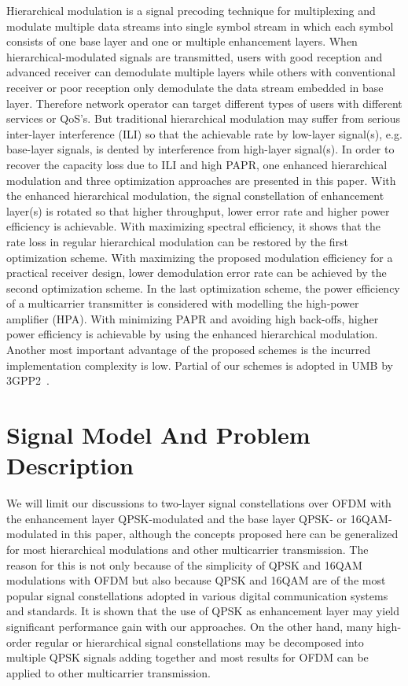 \documentclass[10pt,fleqn, twocolumn]{IEEEtran}
\begin{document}
Hierarchical modulation is a signal precoding technique for
multiplexing and modulate multiple data streams into single symbol
stream in which each symbol consists of one base layer and one or
multiple enhancement layers. When hierarchical-modulated signals
are transmitted, users with good reception and advanced receiver
can demodulate multiple layers while others with conventional
receiver or poor reception only demodulate the data stream
embedded in base layer. Therefore network operator can target
different types of users with different services or QoS's. But
traditional hierarchical modulation may suffer from serious
inter-layer interference (ILI) so that the achievable rate by
low-layer signal(s), e.g. base-layer signals, is dented by
interference from high-layer signal(s). In order to recover the
capacity loss due to ILI and high PAPR, one enhanced hierarchical
modulation and three optimization approaches are presented in this
paper. With the enhanced hierarchical modulation, the signal
constellation of enhancement layer(s) is rotated so that higher
throughput, lower error rate and higher power efficiency is
achievable. With maximizing spectral efficiency, it shows that the
rate loss in regular hierarchical modulation can be restored by
the first optimization scheme. With maximizing the proposed
modulation efficiency for a practical receiver design, lower
demodulation error rate can be achieved by the second optimization
scheme. In the last optimization scheme, the power efficiency of a
multicarrier transmitter is considered with modelling the
high-power amplifier (HPA). With minimizing PAPR and avoiding high
back-offs, higher power efficiency is achievable by using the
enhanced hierarchical modulation. Another most important advantage
of the proposed schemes is the incurred implementation complexity
is low. Partial of our schemes is adopted in UMB by
3GPP2~\cite{UMB}.

\section{Signal Model And Problem Description}
We will limit our discussions to two-layer signal constellations
over OFDM with the enhancement layer QPSK-modulated and the base
layer QPSK- or 16QAM-modulated in this paper, although the
concepts proposed here can be generalized for most hierarchical
modulations and other multicarrier transmission. The reason for
this is not only because of the simplicity of QPSK and 16QAM
modulations with OFDM but also because QPSK and 16QAM are of the
most popular signal constellations adopted in various digital
communication systems and standards. It is shown that the use of
QPSK as enhancement layer may yield significant performance gain
with our approaches. On the other hand, many high-order regular or
hierarchical signal constellations may be decomposed into multiple
QPSK signals adding together and most results for OFDM can be
applied to other multicarrier transmission.
\end{document}
